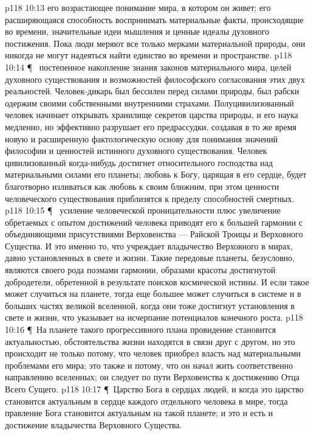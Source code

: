 \vs p118 10:13 \bibnobreakspace {} его возрастающее понимание мира, в котором он живет; его расширяющаяся способность воспринимать материальные факты, происходящие во времени, значительные идеи мышления и ценные идеалы духовного постижения. Пока люди меряют все только мерками материальной природы, они никогда не могут надеяться найти единство во времени и пространстве.
\vs p118 10:14 \P\ \bibnobreakspace {} постепенное накопление знания законов материального мира, целей духовного существования и возможностей философского согласования этих двух реальностей. Человек\hyp{}дикарь был бессилен перед силами природы, был рабски одержим своими собственными внутренними страхами. Полуцивилизованный человек начинает открывать хранилище секретов царства природы, и его наука медленно, но эффективно разрушает его предрассудки, создавая в то же время новую и расширенную фактологическую основу для понимания значений философии и ценностей истинного духовного существования. Человек цивилизованный когда\hyp{}нибудь достигнет относительного господства над материальными силами его планеты; любовь к Богу, царящая в его сердце, будет благотворно изливаться как любовь к своим ближним, при этом ценности человеческого существования приблизятся к пределу способностей смертных.
\vs p118 10:15 \P\ \bibnobreakspace {} усиление человеческой проницательности плюс увеличение обретаемых с опытом достижений человека приводят его к большей гармонии с объединяющими присутствиями Верховенства --- Райской Троицы и Верховного Существа. И это именно то, что учреждает владычество Верховного в мирах, давно установленных в свете и жизни. Такие передовые планеты, безусловно, являются своего рода поэмами гармонии, образами красоты достигнутой добродетели, обретенной в результате поисков космической истины. И если такое может случиться на планете, тогда еще большее может случиться в системе и в больших частях великой вселенной, когда они тоже достигнут установления в свете и жизни, что указывает на исчерпание потенциалов конечного роста.
\vs p118 10:16 \P\ На планете такого прогрессивного плана провидение становится актуальностью, обстоятельства жизни находятся в связи друг с другом, но это происходит не только потому, что человек приобрел власть над материальными проблемами его мира; это также и потому, что он начал жить соответственно направлению вселенных; он следует по пути Верховенства к достижению Отца Всего Сущего.
\vs p118 10:17 \P\ Царство Бога в сердцах людей, и когда это царство становится актуальным в сердце каждого отдельного человека в мире, тогда правление Бога становится актуальным на такой планете; и это и есть и достижение владычества Верховного Существа.
